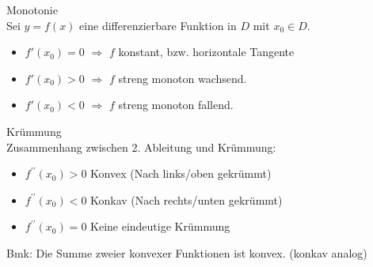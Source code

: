 \begin{definition}[breakable]{Monotonie}\\
    Sei $y=f(x)$ eine differenzierbare Funktion in $D$ mit $x_{0} \in D$.
    \begin{itemize}
        \item $f'( x_{0}) = 0$ $ \Rightarrow$   $f$ konstant, bzw. horizontale Tangente
        \item $f'( x_{0}) > 0 $ $ \Rightarrow$  $f$  streng monoton wachsend.
        \item $f'( x_{0}) < 0 $ $ \Rightarrow$ $f$ streng monoton fallend.
    \end{itemize}
\end{definition}
\begin{theorem}{Krümmung}\\
    Zusammenhang zwischen 2. Ableitung und Krümmung:
    \begin{itemize}
      \item $f^{\prime \prime}(x_{0})>0$ Konvex (Nach links/oben gekrümmt)
      \item $f^{\prime \prime}(x_{0})<0$ Konkav (Nach rechts/unten gekrümmt)
      \item $f^{\prime \prime}(x_{0})=0$ Keine eindeutige Krümmung
    \end{itemize}
    Bmk: Die Summe zweier konvexer Funktionen ist konvex. (konkav analog)
\end{theorem}


